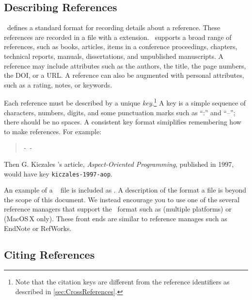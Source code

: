 \subsection{Describing References}

\BibTeX\ defines a standard format for recording details about a
reference.  These references are recorded in a file with a
 extension.  \BibTeX\ supports a broad range of
references, such as books, articles, items in a conference proceedings,
chapters, technical reports, manuals, dissertations, and unpublished
manuscripts. 
A reference may include attributes such as the authors,
the title, the page numbers, the \ac{DOI}, or a \ac{URL}.  A reference
can also be augmented with personal attributes, such as a rating,
notes, or keywords.

Each reference must be described by a unique \emph{key}.\footnote{%
    Note that the citation keys are different from the reference
    identifiers as described in \autoref{sec:CrossReferences}.}
A key is a simple sequence of characters, numbers, digits, and some
punctuation marks such as ``:'' and ``--''; there should be no spaces. 
A consistent key format simiplifies remembering how to make references. 
For example:
\begin{quote}
    \texttt{-}
     \texttt{-} 
\end{quote}
Then G. Kiczales \etal's article, \emph{Aspect-Oriented Programming},
published in 1997, would have key \texttt{kiczales-1997-aop}.

An example of a \BibTeX\  file is included as
.  A description of the format a 
file is beyond the scope of this document.  We instead encourage
you to use one of the several reference managers that support the
\BibTeX\ format such as
 (multiple platforms) or
 (MacOS\,X only). 
These front ends are similar to reference manages such as
EndNote or RefWorks.


\subsection{Citing References}

